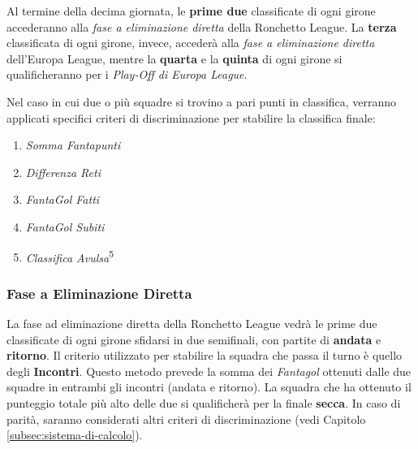 \documentclass[12pt]{article}
\begin{document}
Al termine della decima giornata, le \textbf{prime due} classificate di ogni girone accederanno alla \textit{fase a eliminazione diretta} della Ronchetto League. La \textbf{terza} classificata di ogni girone, invece, accederà alla \textit{fase a eliminazione diretta} dell'Europa League, mentre la \textbf{quarta} e la \textbf{quinta} di ogni girone si qualificheranno per i \textit{Play-Off di Europa League}. 

Nel caso in cui due o più squadre si trovino a pari punti in classifica, verranno applicati specifici criteri di discriminazione per stabilire la classifica finale:

\begin{enumerate}
    \item \textit{Somma Fantapunti}
    \item \textit{Differenza Reti}
    \item \textit{FantaGol Fatti}
    \item \textit{FantaGol Subiti}
    \item \textit{Classifica Avulsa}\textsuperscript{5}
\end{enumerate}

\subsubsection*{Fase a Eliminazione Diretta}
La fase ad eliminazione diretta della Ronchetto League vedrà le prime due classificate di ogni girone sfidarsi in due semifinali, con partite di \textbf{andata} e \textbf{ritorno}.
Il criterio utilizzato per stabilire la squadra che passa il turno è quello degli \textbf{Incontri}. Questo metodo prevede la somma dei \textit{Fantagol} ottenuti dalle due squadre in entrambi gli incontri (andata e ritorno). La squadra che ha ottenuto il punteggio totale più alto delle due si qualificherà per la finale \textbf{secca}. In caso di parità, saranno considerati altri criteri di discriminazione (vedi Capitolo \ref{subsec:sistema-di-calcolo}).
\end{document}
